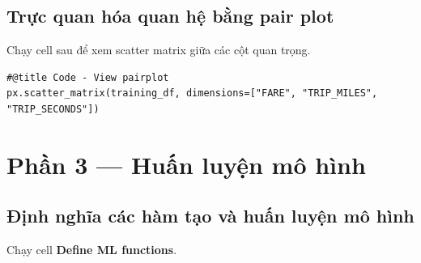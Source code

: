 \documentclass[12pt,a4paper]{article}
\begin{document}
\subsection{Trực quan hóa quan hệ bằng pair plot}

\begin{phuongphap}[title={Pair plot / scatter matrix}]
Chạy cell sau để xem scatter matrix giữa các cột quan trọng.
\end{phuongphap}

\begin{lstlisting}
#@title Code - View pairplot
px.scatter_matrix(training_df, dimensions=["FARE", "TRIP_MILES", "TRIP_SECONDS"])
\end{lstlisting}

\newpage

\section{Phần 3 --- Huấn luyện mô hình}

\subsection{Định nghĩa các hàm tạo và huấn luyện mô hình}

\begin{phuongphap}[title={Hướng dẫn}]
Chạy cell \textbf{Define ML functions}.
\end{phuongphap}
\end{document}
